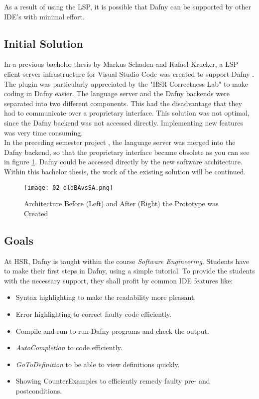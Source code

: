 As a result of using the LSP, it is possible that Dafny can be supported by other IDE's with minimal effort.

\subsection{Initial Solution}
\label{section:management_summary:initialsolution}
In a previous bachelor thesis by Markus Schaden and Rafael Krucker, a LSP client-server infrastructure for Visual Studio Code was created to support Dafny \cite{ba}.
The plugin was particularly appreciated by the "HSR Correctness Lab" \cite{correctnessLab} to make coding in Dafny easier.
The language server and the Dafny backends were separated into two different components.
This had the disadvantage that they had to communicate over a proprietary interface.
This solution was not optimal, since the Dafny backend was not accessed directly.
Implementing new features was very time consuming. \\

In the preceding semester project \cite{sa}, the language server was merged into the Dafny backend, so that the proprietary interface became obsolete as you can see in figure \ref{fig:oldBAvsSA}.
Dafny could be accessed directly by the new software architecture.
Within this bachelor thesis, the work of the existing solution will be continued.

\begin{figure}[H]
    \centering
    \texttt{[image: 02\_oldBAvsSA.png]}
    \caption{Architecture Before (Left) and After (Right) the Prototype was Created}
    \label{fig:oldBAvsSA}
\end{figure}

\subsection{Goals}
At HSR, Dafny is taught within the course \textit{Software Engineering}.
Students have to make their first steps in Dafny, using a simple tutorial.
To provide the students with the necessary support, they shall profit by common IDE features like:
\begin{itemize}
    \item Syntax highlighting to make the readability more pleasant.
    \item Error highlighting to correct faulty code efficiently.
    \item Compile and run to run Dafny programs and check the output.
    \item \textit{AutoCompletion} to code efficiently.
    \item \textit{GoToDefinition} to be able to view definitions quickly.
    \item Showing CounterExamples to efficiently remedy faulty pre- and postconditions.
\end{itemize}

